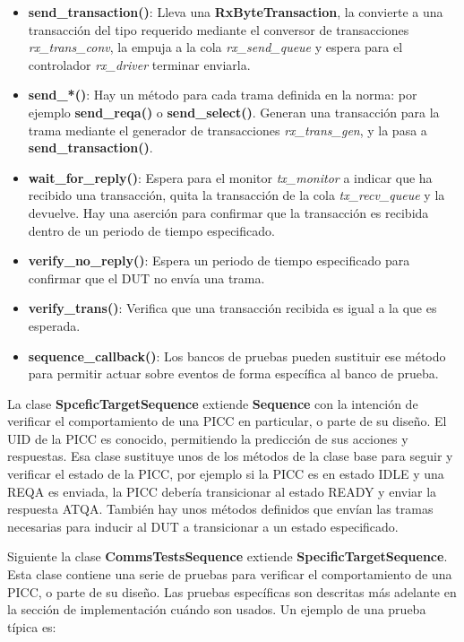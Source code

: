 \documentclass[a4paper, twoside, 11pt]{report}
\begin{document}
\begin{itemize}
  \item \textbf{send\_transaction()}: Lleva una \textbf{RxByteTransaction}, la convierte a una transacción del tipo requerido mediante el conversor de transacciones \textit{rx\_trans\_conv}, la empuja a la cola \textit{rx\_send\_queue} y espera para el controlador \textit{rx\_driver} terminar enviarla.
  \item \textbf{send\_*()}: Hay un método para cada trama definida en la norma: por ejemplo \textbf{send\_reqa()} o \textbf{send\_select()}. Generan una transacción para la trama mediante el generador de transacciones \textit{rx\_trans\_gen}, y la pasa a \textbf{send\_transaction()}.
  \item \textbf{wait\_for\_reply()}: Espera para el monitor \textit{tx\_monitor} a indicar que ha recibido una transacción, quita la transacción de la cola \textit{tx\_recv\_queue} y la devuelve. Hay una aserción para confirmar que la transacción es recibida dentro de un periodo de tiempo especificado.
  \item \textbf{verify\_no\_reply()}: Espera un periodo de tiempo especificado para confirmar que el DUT no envía una trama.
  \item \textbf{verify\_trans()}: Verifica que una transacción recibida es igual a la que es esperada.
  \item \textbf{sequence\_callback()}: Los bancos de pruebas pueden sustituir ese método para permitir actuar sobre eventos de forma específica al banco de prueba.
\end{itemize}
La clase \textbf{SpceficTargetSequence} extiende \textbf{Sequence} con la intención de verificar el comportamiento de una PICC en particular, o parte de su diseño. El UID de la PICC es conocido, permitiendo la predicción de sus acciones y respuestas. Esa clase sustituye unos de los métodos de la clase base para seguir y verificar el estado de la PICC, por ejemplo si la PICC es en estado IDLE y una REQA es enviada, la PICC debería transicionar al estado READY y enviar la respuesta ATQA. También hay unos métodos definidos que envían las tramas necesarias para inducir al DUT a transicionar a un estado especificado.

Siguiente la clase \textbf{CommsTestsSequence} extiende \textbf{SpecificTargetSequence}. Esta clase contiene una serie de pruebas para verificar el comportamiento de una PICC, o parte de su diseño. Las pruebas específicas son descritas más adelante en la sección de implementación cuándo son usados. Un ejemplo de una prueba típica es:
\end{document}
